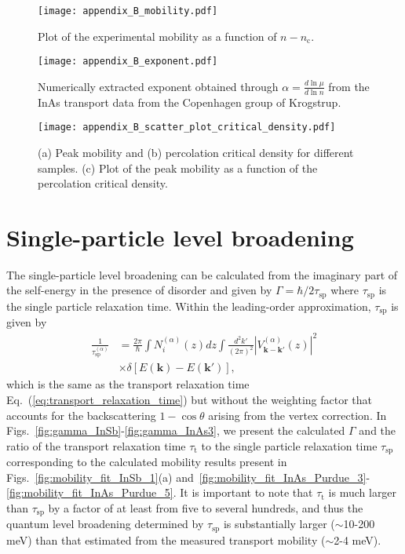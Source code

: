 \documentclass[aps,prmaterials,twocolumn,superscriptaddress,longbibliography]{revtex4-2}
\begin{document}
\begin{figure*}[!htb]
    \centering
    \texttt{[image: appendix\_B\_mobility.pdf]}
    \caption{Plot of the experimental mobility as a function of $n-n_\mathrm{c}$.}
    \label{fig:appendix_B_mu}
  \end{figure*}


\begin{figure*}[!htb]
  \centering
  \texttt{[image: appendix\_B\_exponent.pdf]}
  \caption{Numerically extracted exponent obtained through $\alpha = \frac{d\ln{\mu}}{d\ln{n}}$ from the InAs transport data from the Copenhagen group of Krogstrup. }
  \label{fig:appendix_B_alpha}
\end{figure*}


\begin{figure*}[!htb]
  \centering
  \texttt{[image: appendix\_B\_scatter\_plot\_critical\_density.pdf]}
  \caption{(a) Peak mobility and (b) percolation critical density for different samples. (c) Plot of the peak mobility as a function of the percolation critical density.}
  \label{fig:appendix_B_scatter_plot_critical_density}
\end{figure*}


\section{Single-particle level broadening}\label{app:C}
The single-particle level broadening can be calculated from the imaginary part of the self-energy in the presence of disorder and given by $\Gamma=\hbar/2\tau_\mathrm{sp}$ where $\tau_\mathrm{sp}$ is the single particle relaxation time. Within the leading-order approximation, $\tau_\mathrm{sp}$ is given by
\begin{equation}
\begin{aligned}
    \frac{1}{\tau_\mathrm{sp}^{(\alpha)}}&=\frac{2\pi}{\hbar} \int N_i^{(\alpha)}(z) dz \int  \frac{d^2 k'}{(2\pi)^2} \left| V^{(\alpha)}_{\bm k- \bm k'}(z) \right|^2 \\
    &\times \delta[E(\bm k)-E(\bm k')],
    \label{eq:single_particle_relaxation_time}
\end{aligned}
\end{equation}
which is the same as the transport relaxation time Eq.~(\ref{eq:transport_relaxation_time}) but without the weighting factor that accounts for the backscattering $1-\cos\theta$ arising from the vertex correction. In Figs.~\ref{fig:gamma_InSb}-\ref{fig:gamma_InAs3}, we present the calculated $\Gamma$ and the ratio of the transport relaxation time $\tau_\mathrm{t}$ to the single particle relaxation time $\tau_\mathrm{sp}$ corresponding to the calculated mobility results present in Figs.~\ref{fig:mobility_fit_InSb_1}(a) and~\ref{fig:mobility_fit_InAs_Purdue_3}-\ref{fig:mobility_fit_InAs_Purdue_5}. It is important to note that $\tau_\mathrm{t}$ is much larger than $\tau_\mathrm{sp}$ by a factor of at least from five to several hundreds, and thus the quantum level broadening determined by $\tau_\mathrm{sp}$ is substantially larger ($\sim$10-200 meV) than that estimated from the measured transport mobility ($\sim$2-4 meV).
\end{document}
